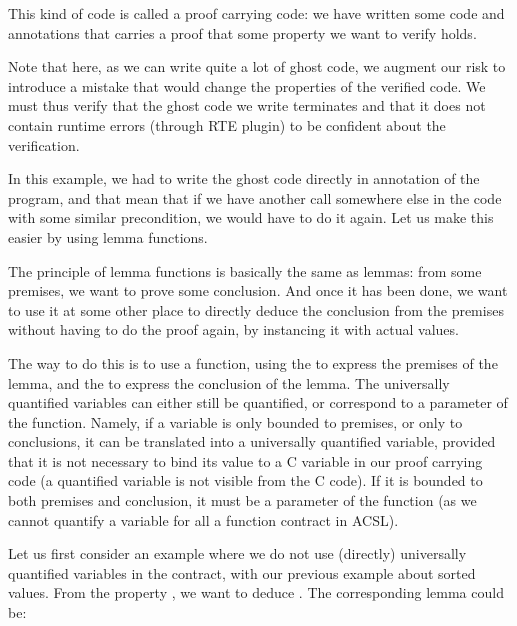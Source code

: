 

This kind of code is called a proof carrying code: we have written some code
and annotations that carries a proof that some property we want to verify holds.



Note that here, as we can write quite a lot of ghost code, we augment our risk
to introduce a mistake that would change the properties of the verified code.
We must thus verify that the ghost code we write terminates and that it does
not contain runtime errors (through RTE plugin) to be confident about the
verification.



In this example, we had to write the ghost code directly in annotation of the
program, and that mean that if we have another call somewhere else in the code
with some similar precondition, we would have to do it again. Let us make this
easier by using lemma functions.






The principle of lemma functions is basically the same as lemmas: from some
premises, we want to prove some conclusion. And once it has been done, we want
to use it at some other place to directly deduce the conclusion from the
premises without having to do the proof again, by instancing it with actual
values.



The way to do this is to use a function, using the  to
express the premises of the lemma, and the  to express the
conclusion of the lemma. The universally quantified variables can either still
be quantified, or correspond to a parameter of the function. Namely, if a
variable is only bounded to premises, or only to conclusions, it can be
translated into a universally quantified variable, provided that it is not
necessary to bind its value to a C variable in our proof carrying code (a
quantified variable is not visible from the C code). If it is bounded to both
premises and conclusion, it must be a parameter of the function (as we cannot
quantify a variable for all a function contract in ACSL).



Let us first consider an example where we do not use (directly) universally
quantified variables in the contract, with our previous example about sorted
values. From the property , we
want to deduce . The corresponding lemma could be:


